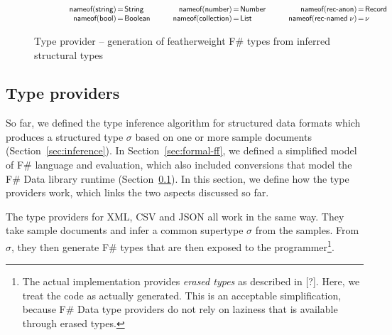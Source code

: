 \documentclass[preprint]{sigplanconf}
\newcommand{\ident}[1]{\textnormal{\sffamily #1}}
\newcommand{\narrow}[1]{\hspace{-0.85em} #1 \hspace{-0.85em}}
\newcommand{\nameoftag}{\ident{nameof}}
\begin{document}
\begin{figure}
\vspace{-0.5em}
\noindent
\begin{equation*}
\qquad
\qquad
\begin{array}{rcl}
 \nameoftag(\ident{string}) &\narrow{=}& \ident{String} \\
 \nameoftag(\ident{bool}) &\narrow{=}& \ident{Boolean} \\
\end{array}
\qquad
\begin{array}{rcl}
 \nameoftag(\ident{number}) &\narrow{=}& \ident{Number} \\
 \nameoftag(\ident{collection}) &\narrow{=}& \ident{List} \\
\end{array}
\qquad
\begin{array}{rcl}
 \nameoftag(\ident{rec-anon}) &\narrow{=}& \ident{Record} \\
 \nameoftag(\ident{rec-named}\;\nu) &\narrow{=}& \nu \\
\end{array}
\end{equation*}

\caption{Type provider -- generation of featherweight F\# types from inferred structural types}
\label{fig:tp-generation}
\vspace{-0.5em}
\end{figure}


\subsection{Type providers}
\label{sec:formal-tp}

So far, we defined the type inference algorithm for structured data formats which produces a structured
type $\sigma$ based on one or more sample documents (Section~\ref{sec:inference}). In Section~\ref{sec:formal-ff},
we defined a simplified model of F\# language and evaluation, which also included conversions that
model the F\# Data library runtime (Section~\ref{sec:formal-tp}). In this section, we define how
the type providers work, which links the two aspects discussed so far.

The type providers for XML, CSV and JSON all work in the same way. They take sample documents and infer a common
supertype $\sigma$ from the samples. From $\sigma$, they then generate F\# types that are then exposed to the
programmer\footnote{The actual implementation provides \emph{erased types} as described in [?]. Here, we treat
the code as actually generated. This is an acceptable simplification, because F\# Data type providers do not 
rely on laziness that is available through erased types.}. 
\end{document}
